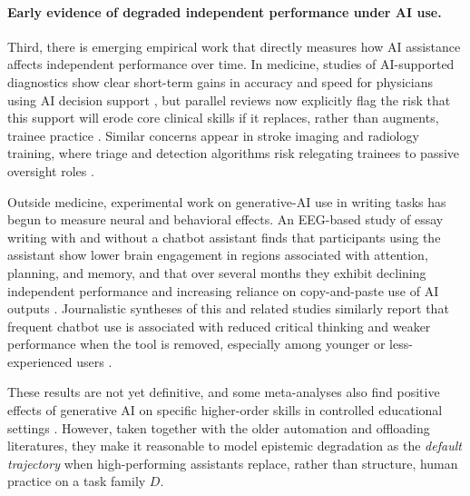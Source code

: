\paragraph{Early evidence of degraded independent performance under AI use.}
Third, there is emerging empirical work that directly measures how AI assistance affects
independent performance over time. In medicine, studies of AI-supported diagnostics show
clear short-term gains in accuracy and speed for physicians using AI decision support
\citep[e.g.][]{anderson_deep_learning_physician_accuracy_2024,lai_concurrent_read_ai_2022,
lim_medical_ai_workload_2025}, but parallel reviews now explicitly flag the risk that this
support will erode core clinical skills if it replaces, rather than augments, trainee
practice \citep{natali_ai_deskilling_medicine_2025,berzin_preserving_clinical_skills_2025,
sunday_behavioral_impacts_diagnostics_2025,fatima_ai_triage_deskilling_2025}. Similar
concerns appear in stroke imaging and radiology training, where triage and detection
algorithms risk relegating trainees to passive oversight roles
\citep{fatima_ai_triage_deskilling_2025,savardi_ai_radiology_training_2025}.

Outside medicine, experimental work on generative-AI use in writing tasks has begun to
measure neural and behavioral effects. An EEG-based study of essay writing with and
without a chatbot assistant finds that participants using the assistant show lower brain
engagement in regions associated with attention, planning, and memory, and that over
several months they exhibit declining independent performance and increasing reliance on
copy-and-paste use of AI outputs \citep{kosmyna_brain_on_chatgpt_2025}. Journalistic
syntheses of this and related studies similarly report that frequent chatbot use is
associated with reduced critical thinking and weaker performance when the tool is removed,
especially among younger or less-experienced users
\citep{washpost_ai_rewiring_minds_2025,guardian_ai_harming_intelligence_2025}.

These results are not yet definitive, and some meta-analyses also find positive effects of
generative AI on specific higher-order skills in controlled educational settings
\citep{zhao_genai_higher_order_thinking_2025}. However, taken together with the older
automation and offloading literatures, they make it reasonable to model epistemic
degradation as the \emph{default trajectory} when high-performing assistants replace, rather
than structure, human practice on a task family $D$.


